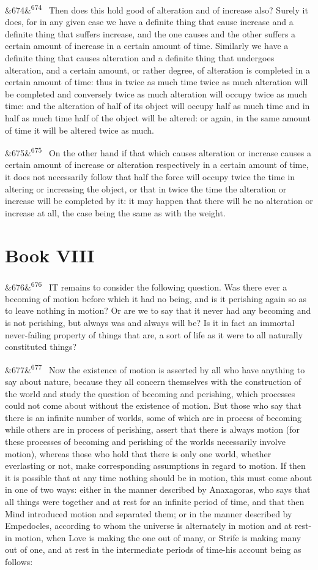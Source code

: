 \documentclass[12pt]{article}
\newcommand{\para}[1][]{\par\noindent\ifx&#1&\else\textsuperscript{\footnotesize #1}~\fi}
\begin{document}
\para[674] Then does this hold good of alteration and of increase also? Surely it does, for in any given case we have a definite thing that cause increase and a definite thing that suffers increase, and the one causes and the other suffers a certain amount of increase in a certain amount of time. Similarly we have a definite thing that causes alteration and a definite thing that undergoes alteration, and a certain amount, or rather degree, of alteration is completed in a certain amount of time: thus in twice as much time twice as much alteration will be completed and conversely twice as much alteration will occupy twice as much time: and the alteration of half of its object will occupy half as much time and in half as much time half of the object will be altered: or again, in the same amount of time it will be altered twice as much.

\para[675] On the other hand if that which causes alteration or increase causes a certain amount of increase or alteration respectively in a certain amount of time, it does not necessarily follow that half the force will occupy twice the time in altering or increasing the object, or that in twice the time the alteration or increase will be completed by it: it may happen that there will be no alteration or increase at all, the case being the same as with the weight.

\section*{Book VIII}

\para[676] IT remains to consider the following question. Was there ever a becoming of motion before which it had no being, and is it perishing again so as to leave nothing in motion? Or are we to say that it never had any becoming and is not perishing, but always was and always will be? Is it in fact an immortal never-failing property of things that are, a sort of life as it were to all naturally constituted things?

\para[677] Now the existence of motion is asserted by all who have anything to say about nature, because they all concern themselves with the construction of the world and study the question of becoming and perishing, which processes could not come about without the existence of motion. But those who say that there is an infinite number of worlds, some of which are in process of becoming while others are in process of perishing, assert that there is always motion (for these processes of becoming and perishing of the worlds necessarily involve motion), whereas those who hold that there is only one world, whether everlasting or not, make corresponding assumptions in regard to motion. If then it is possible that at any time nothing should be in motion, this must come about in one of two ways: either in the manner described by Anaxagoras, who says that all things were together and at rest for an infinite period of time, and that then Mind introduced motion and separated them; or in the manner described by Empedocles, according to whom the universe is alternately in motion and at rest-in motion, when Love is making the one out of many, or Strife is making many out of one, and at rest in the intermediate periods of time-his account being as follows:
\end{document}
